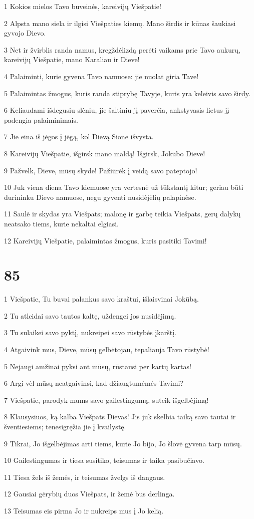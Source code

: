\par 1 Kokios mielos Tavo buveinės, kareivijų Viešpatie! 
\par 2 Alpsta mano siela ir ilgisi Viešpaties kiemų. Mano širdis ir kūnas šaukiasi gyvojo Dievo. 
\par 3 Net ir žvirblis randa namus, kregždė­lizdą perėti vaikams prie Tavo aukurų, kareivijų Viešpatie, mano Karaliau ir Dieve! 
\par 4 Palaiminti, kurie gyvena Tavo namuose: jie nuolat giria Tave! 
\par 5 Palaimintas žmogus, kuris randa stiprybę Tavyje, kuris yra keleivis savo širdy. 
\par 6 Keliaudami išdegusiu slėniu, jie šaltiniu jį paverčia, ankstyvasis lietus jį padengia palaiminimais. 
\par 7 Jie eina iš jėgos į jėgą, kol Dievą Sione išvysta. 
\par 8 Kareivijų Viešpatie, išgirsk mano maldą! Išgirsk, Jokūbo Dieve! 
\par 9 Pažvelk, Dieve, mūsų skyde! Pažiūrėk į veidą savo pateptojo! 
\par 10 Juk viena diena Tavo kiemuose yra vertesnė už tūkstantį kitur; geriau būti durininku Dievo namuose, negu gyventi nusidėjėlių palapinėse. 
\par 11 Saulė ir skydas yra Viešpats; malonę ir garbę teikia Viešpats, gerų dalykų neatsako tiems, kurie nekaltai elgiasi. 
\par 12 Kareivijų Viešpatie, palaimintas žmogus, kuris pasitiki Tavimi!


\chapter{85}


\par 1 Viešpatie, Tu buvai palankus savo kraštui, išlaisvinai Jokūbą. 
\par 2 Tu atleidai savo tautos kaltę, uždengei jos nusidėjimą. 
\par 3 Tu sulaikei savo pyktį, nukreipei savo rūstybės įkarštį. 
\par 4 Atgaivink mus, Dieve, mūsų gelbėtojau, tepaliauja Tavo rūstybė! 
\par 5 Nejaugi amžinai pyksi ant mūsų, rūstausi per kartų kartas! 
\par 6 Argi vėl mūsų neatgaivinsi, kad džiaugtumėmės Tavimi? 
\par 7 Viešpatie, parodyk mums savo gailestingumą, suteik išgelbėjimą! 
\par 8 Klausysiuos, ką kalba Viešpats Dievas! Jis juk skelbia taiką savo tautai ir šventiesiems; tenesigręžia jie į kvailystę. 
\par 9 Tikrai, Jo išgelbėjimas arti tiems, kurie Jo bijo, Jo šlovė gyvena tarp mūsų. 
\par 10 Gailestingumas ir tiesa susitiko, teisumas ir taika pasibučiavo. 
\par 11 Tiesa žels iš žemės, ir teisumas žvelgs iš dangaus. 
\par 12 Gausiai gėrybių duos Viešpats, ir žemė bus derlinga. 
\par 13 Teisumas eis pirma Jo ir nukreips mus į Jo kelią.


